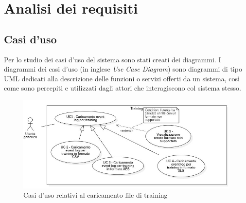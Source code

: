 
\chapter{Analisi dei requisiti}

\section{Casi d'uso}

Per lo studio dei casi d'uso del sistema sono stati creati dei diagrammi.
I diagrammi dei casi d'uso (in inglese \emph{Use Case Diagram}) sono diagrammi di tipo \gls{UML} dedicati alla descrizione delle funzioni o servizi offerti da un sistema, così come sono percepiti e utilizzati dagli attori che interagiscono col sistema stesso.



\begin{figure}[H]
    \centering
    \includegraphics[scale=0.6]{immagini/usecase/cd1.JPG}
    \caption{Casi d'uso relativi al caricamento file di training}
\end{figure}

